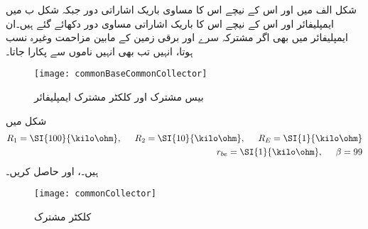 شکل  الف میں  اور اس کے نیچے اس کا مساوی باریک اشاراتی دور  جبکہ شکل  ب میں  ایمپلیفائر اور اس کے نیچے اس کا باریک اشاراتی مساوی دور دکھائے گئے ہیں۔ان ایمپلیفائر میں بھی اگر مشترکہ سرے اور برقی زمین کے مابین مزاحمت وغیرہ نسب ہوتا، انہیں تب بھی انہیں ناموں سے پکارا جاتا۔
\begin{figure}
\centering
\texttt{[image: commonBaseCommonCollector]}
\caption{بیس مشترک اور کلکٹر  مشترک ایمپلیفائر}
\label{شکل_دو_جوڑ_ٹرانزسٹر_مشترکہ_قابو_مشترکہ_کلکٹر _ایمپلیفائر}
\end{figure}
شکل  میں
\begin{align*}
R_1=\SI{100}{\kilo \ohm}, \hspace{5mm} R_{2}=\SI{10}{\kilo \ohm}, \hspace{5mm} R_E=\SI{1}{\kilo \ohm}\\
r_{be}=\SI{1}{\kilo \ohm}, \hspace{5mm} \beta=99
\end{align*}
ہیں۔،  اور  حاصل کریں۔
\begin{figure}
\centering
\texttt{[image: commonCollector]}
\caption{کلکٹر  مشترک}
\label{شکل_ٹرانزسٹر_کلکٹر _مشترک}
\end{figure}

